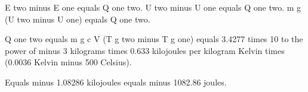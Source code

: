 E two minus E one equals Q one two.  
U two minus U one equals Q one two.  
m g (U two minus U one) equals Q one two.  

Q one two equals m g c V (T g two minus T g one) equals 3.4277 times 10 to the power of minus 3 kilograms times 0.633 kilojoules per kilogram Kelvin times (0.0036 Kelvin minus 500 Celsius).  

Equals minus 1.08286 kilojoules equals minus 1082.86 joules.